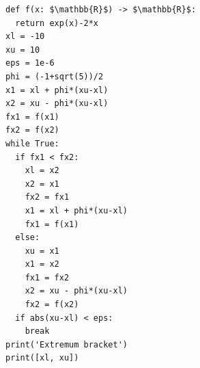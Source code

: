 \documentclass[border=10pt]{standalone}
\begin{document}
\begin{lstlisting}
def f(x: $\mathbb{R}$) -> $\mathbb{R}$:
  return exp(x)-2*x                                        
xl = -10                                                   
xu = 10 
eps = 1e-6                                                 
phi = (-1+sqrt(5))/2
x1 = xl + phi*(xu-xl)                                      
x2 = xu - phi*(xu-xl)                                      
fx1 = f(x1)                                                
fx2 = f(x2)
while True:
  if fx1 < fx2:
    xl = x2                                                
    x2 = x1                                                
    fx2 = fx1                                              
    x1 = xl + phi*(xu-xl)                                  
    fx1 = f(x1)                                            
  else:
    xu = x1
    x1 = x2 
    fx1 = fx2
    x2 = xu - phi*(xu-xl)                                  
    fx2 = f(x2)                                            
  if abs(xu-xl) < eps:                                     
    break 
print('Extremum bracket')                                  
print([xl, xu])
\end{lstlisting}
\end{document}

